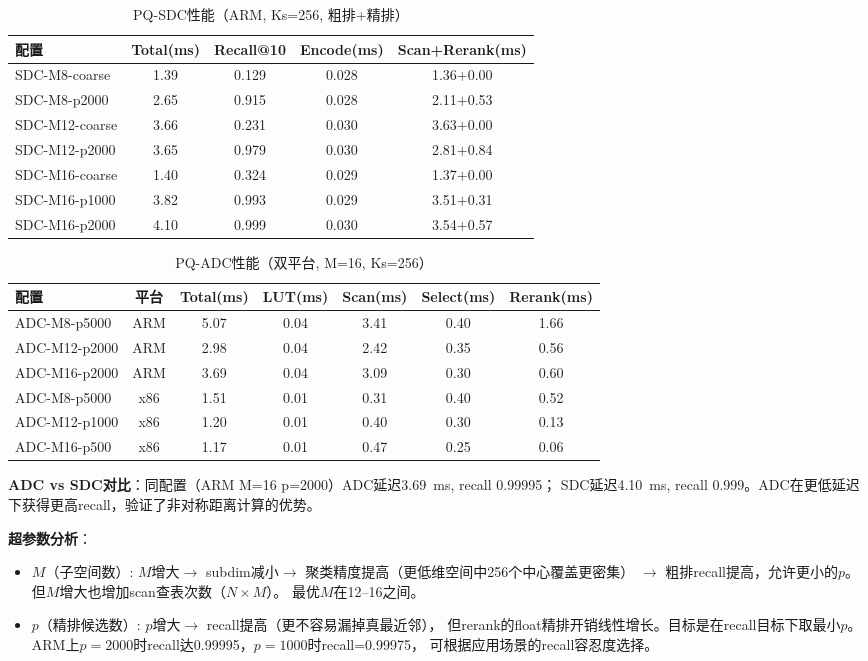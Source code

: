 \documentclass[11pt,a4paper]{article}
\begin{document}
\begin{table}[H]
\centering
\caption{PQ-SDC性能（ARM, Ks=256, 粗排+精排）}
\label{tab:sdc}
\small
\begin{tabular}{lcccc}
\toprule
\textbf{配置} & \textbf{Total(ms)} & \textbf{Recall@10} & \textbf{Encode(ms)} & \textbf{Scan+Rerank(ms)} \\
\midrule
SDC-M8-coarse   & 1.39 & 0.129 & 0.028 & 1.36$+$0.00 \\
SDC-M8-p2000    & 2.65 & 0.915 & 0.028 & 2.11$+$0.53 \\
SDC-M12-coarse  & 3.66 & 0.231 & 0.030 & 3.63$+$0.00 \\
SDC-M12-p2000   & 3.65 & 0.979 & 0.030 & 2.81$+$0.84 \\
SDC-M16-coarse  & 1.40 & 0.324 & 0.029 & 1.37$+$0.00 \\
SDC-M16-p1000   & 3.82 & 0.993 & 0.029 & 3.51$+$0.31 \\
SDC-M16-p2000   & 4.10 & 0.999 & 0.030 & 3.54$+$0.57 \\
\bottomrule
\end{tabular}
\end{table}

\begin{table}[H]
\centering
\caption{PQ-ADC性能（双平台, M=16, Ks=256）}
\label{tab:adc}
\small
\begin{tabular}{lcccccc}
\toprule
\textbf{配置} & \textbf{平台} & \textbf{Total(ms)} & \textbf{LUT(ms)} & \textbf{Scan(ms)} & \textbf{Select(ms)} & \textbf{Rerank(ms)} \\
\midrule
ADC-M8-p5000  & ARM & 5.07 & 0.04 & 3.41 & 0.40 & 1.66 \\
ADC-M12-p2000 & ARM & 2.98 & 0.04 & 2.42 & 0.35 & 0.56 \\
ADC-M16-p2000 & ARM & 3.69 & 0.04 & 3.09 & 0.30 & 0.60 \\
\midrule
ADC-M8-p5000  & x86 & 1.51 & 0.01 & 0.31 & 0.40 & 0.52 \\
ADC-M12-p1000 & x86 & 1.20 & 0.01 & 0.40 & 0.30 & 0.13 \\
ADC-M16-p500  & x86 & 1.17 & 0.01 & 0.47 & 0.25 & 0.06 \\
\bottomrule
\end{tabular}
\end{table}

\textbf{ADC vs SDC对比}：同配置（ARM M=16 p=2000）ADC延迟3.69~ms, recall 0.99995；
SDC延迟4.10~ms, recall 0.999。ADC在更低延迟下获得更高recall，验证了非对称距离计算的优势。

\textbf{超参数分析}：
\begin{itemize}[nosep]
    \item $M$（子空间数）: $M$增大$\to$ subdim减小$\to$ 聚类精度提高（更低维空间中256个中心覆盖更密集）
          $\to$ 粗排recall提高，允许更小的$p$。但$M$增大也增加scan查表次数（$N\times M$）。
          最优$M$在12--16之间。
    \item $p$（精排候选数）: $p$增大$\to$ recall提高（更不容易漏掉真最近邻），
          但rerank的float精排开销线性增长。目标是在recall目标下取最小$p$。
          ARM上$p=2000$时recall达0.99995，$p=1000$时recall=0.99975，
          可根据应用场景的recall容忍度选择。
\end{itemize}
\end{document}
